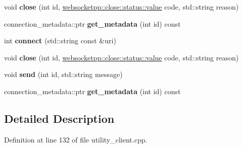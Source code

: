 \begin{DoxyCompactItemize}
\item 
void {\bfseries close} (int id, \hyperlink{namespacewebsocketpp_1_1close_1_1status_a8614a5c4733d708e2d2a32191c5bef84}{websocketpp\+::close\+::status\+::value} code, std\+::string reason)\hypertarget{classwebsocket__endpoint_ac18bcc30c3894c74c9ad028b47c299f9}{}\label{classwebsocket__endpoint_ac18bcc30c3894c74c9ad028b47c299f9}

\item 
connection\+\_\+metadata\+::ptr {\bfseries get\+\_\+metadata} (int id) const\hypertarget{classwebsocket__endpoint_a5896c27213953d2d33b88e117b1971f6}{}\label{classwebsocket__endpoint_a5896c27213953d2d33b88e117b1971f6}

\item 
int {\bfseries connect} (std\+::string const \&uri)\hypertarget{classwebsocket__endpoint_a5850523b829e145793d42e137d5eb8c0}{}\label{classwebsocket__endpoint_a5850523b829e145793d42e137d5eb8c0}

\item 
void {\bfseries close} (int id, \hyperlink{namespacewebsocketpp_1_1close_1_1status_a8614a5c4733d708e2d2a32191c5bef84}{websocketpp\+::close\+::status\+::value} code, std\+::string reason)\hypertarget{classwebsocket__endpoint_ac18bcc30c3894c74c9ad028b47c299f9}{}\label{classwebsocket__endpoint_ac18bcc30c3894c74c9ad028b47c299f9}

\item 
void {\bfseries send} (int id, std\+::string message)\hypertarget{classwebsocket__endpoint_aaae3d15cae0c3d7fd134ca28676e53cc}{}\label{classwebsocket__endpoint_aaae3d15cae0c3d7fd134ca28676e53cc}

\item 
connection\+\_\+metadata\+::ptr {\bfseries get\+\_\+metadata} (int id) const\hypertarget{classwebsocket__endpoint_a5896c27213953d2d33b88e117b1971f6}{}\label{classwebsocket__endpoint_a5896c27213953d2d33b88e117b1971f6}

\end{DoxyCompactItemize}


\subsection{Detailed Description}


Definition at line 132 of file utility\+\_\+client.\+cpp.



